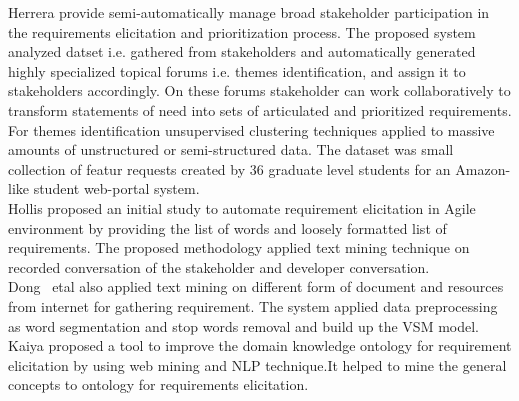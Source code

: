  
 Herrera \etal \cite{Castro-Herrera:2009} provide semi-automatically manage broad stakeholder participation in the requirements elicitation and prioritization process. 
The proposed system analyzed datset i.e. gathered from stakeholders and automatically generated highly specialized topical forums i.e. themes identification, and assign it to stakeholders accordingly.
On these forums stakeholder can work collaboratively to transform statements of need into sets of articulated and prioritized requirements. For themes identification unsupervised clustering
techniques applied to massive amounts of unstructured or semi-structured data. The dataset was  small collection of featur requests created by 36 graduate level students for an Amazon-like student web-portal system.\\

Hollis \etal \cite{Hollis2017} proposed an initial study to automate requirement elicitation in Agile environment by providing the list of
words and loosely formatted list of requirements. The proposed methodology
applied text mining technique on recorded conversation of the stakeholder and
developer conversation.\\
Dong ~etal \cite{dong2010} also applied text mining on
different form of document and resources from internet for gathering
requirement. The system applied data preprocessing as word segmentation and stop
words removal and build up the VSM model. Kaiya \etal \cite {Kaiya:2010} proposed a
tool to improve the domain knowledge ontology for requirement elicitation by using web mining and NLP
technique.It helped to mine the general
concepts to ontology for requirements elicitation.\\


